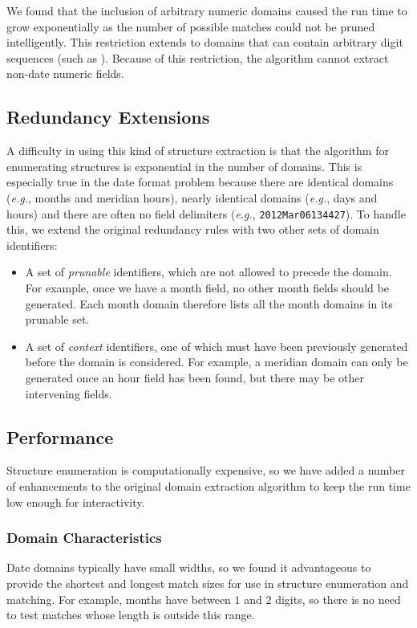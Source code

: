 We found that the inclusion of arbitrary numeric domains caused the run time to grow exponentially as the number of possible matches could not be pruned intelligently. 
This restriction extends to domains that can contain arbitrary digit sequences (such as ). Because of this restriction, the algorithm cannot extract non-date numeric fields.
\subsection{Redundancy Extensions} \label{subsec:mdl:redundancy}
A difficulty in using this kind of structure extraction is that the algorithm for enumerating structures is exponential in the number of domains. This is especially true in the date format problem because there are identical domains (\textit{e.g.}, months and meridian hours), nearly identical domains (\textit{e.g.}, days and hours) and there are often no field delimiters (\textit{e.g.}, \texttt{2012Mar06134427}). To handle this, we extend the original redundancy rules with two other sets of domain identifiers:
\begin{itemize}
\setlength\itemsep{0em}
\item A set of \textit{prunable} identifiers, which are not allowed to precede the domain. For example, once we have a month field, no other month fields should be generated. Each month domain therefore lists all the month domains in its prunable set.
\item A set of \textit{context} identifiers, one of which must have been previously generated before the domain is considered. For example, a meridian domain can only be generated once an hour field has been found, but there may be other intervening fields.
\end{itemize}

\subsection{Performance}
Structure enumeration is computationally expensive, so we have added a number of enhancements to the original domain extraction algorithm to keep the run time low enough for interactivity.

\subsubsection{Domain Characteristics}
Date domains typically have small widths, so we found it advantageous to provide the shortest and longest match sizes for use in structure enumeration and matching. For example, months have between $1$ and $2$ digits, so there is no need to test matches whose length is outside this range.

